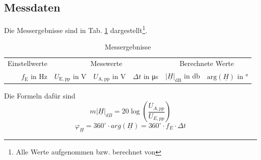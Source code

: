 %
\subsection{Messdaten}
\label{subsec:4_Daten}
%
Die Messergebnisse sind in Tab. \ref{tab:4_Messdaten} dargestellt\footnote{Alle Werte aufgenommen bzw. berechnet von \autorA}.
%
\begin{table}[H]
  \small
  \centering
	\caption{Messergebnisse}
	\label{tab:4_Messdaten}
	\begin{tabular}{rrrrrr}
	  \toprule
	  \multicolumn{1}{c}{Einstellwerte} &
		\multicolumn{3}{c}{Messwerte} &
		\multicolumn{2}{c}{Berechnete Werte} \\
		\cmidrule(lr{1mm}){1-1}\cmidrule(lr{1mm}){2-4}\cmidrule(lr{1mm}){5-6}
		$f_\mathrm{E}$ in \si{\hertz} &
			$U_\mathrm{E,pp}$ in \si{\volt} &
    		$U_\mathrm{A,pp}$ in \si{\volt} &
    		$\Delta t$ in \si{\micro\second} &
    			$|\underline{H}|_\mathrm{dB}$ in \si{\decibel} &
				$\mathrm{arg}(\underline{H})$ in \si{\degree}\\
		\midrule
    
		\bottomrule
	\end{tabular}
\end{table}
%
Die Formeln dafür sind
\[m|\underline{H}|_{dB}=20\log(\frac{U_{A,pp}}{U_{E,pp}})\]
\[{\varphi}_{\underline H}=360^\circ \cdot arg(\underline{H})=360^\circ \cdot f_E \cdot \Delta t \]
%
%
\newpage

